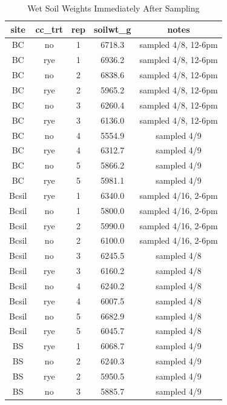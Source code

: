 \documentclass[]{article}
\begin{document}
\begin{table}[H]

\caption{\label{tab:unnamed-chunk-4}Wet Soil Weights Immediately After Sampling}
\centering
\begin{tabular}[t]{ccccc}
\toprule
site & cc\_trt & rep & soilwt\_g & notes\\
\midrule
\rowcolor{gray!6}  BC & no & 1 & 6718.3 & sampled 4/8, 12-6pm\\
BC & rye & 1 & 6936.2 & sampled 4/8, 12-6pm\\
\rowcolor{gray!6}  BC & no & 2 & 6838.6 & sampled 4/8, 12-6pm\\
BC & rye & 2 & 5965.2 & sampled 4/8, 12-6pm\\
\rowcolor{gray!6}  BC & no & 3 & 6260.4 & sampled 4/8, 12-6pm\\
\addlinespace
BC & rye & 3 & 6136.0 & sampled 4/8, 12-6pm\\
\rowcolor{gray!6}  BC & no & 4 & 5554.9 & sampled 4/9\\
BC & rye & 4 & 6312.7 & sampled 4/9\\
\rowcolor{gray!6}  BC & no & 5 & 5866.2 & sampled 4/9\\
BC & rye & 5 & 5981.1 & sampled 4/9\\
\addlinespace
\rowcolor{gray!6}  Bcsil & rye & 1 & 6340.0 & sampled 4/16, 2-6pm\\
Bcsil & no & 1 & 5800.0 & sampled 4/16, 2-6pm\\
\rowcolor{gray!6}  Bcsil & rye & 2 & 5990.0 & sampled 4/16, 2-6pm\\
Bcsil & no & 2 & 6100.0 & sampled 4/16, 2-6pm\\
\rowcolor{gray!6}  Bcsil & no & 3 & 6245.5 & sampled 4/8\\
\addlinespace
Bcsil & rye & 3 & 6160.2 & sampled 4/8\\
\rowcolor{gray!6}  Bcsil & no & 4 & 6240.2 & sampled 4/8\\
Bcsil & rye & 4 & 6007.5 & sampled 4/8\\
\rowcolor{gray!6}  Bcsil & no & 5 & 6682.9 & sampled 4/8\\
Bcsil & rye & 5 & 6045.7 & sampled 4/8\\
\addlinespace
\rowcolor{gray!6}  BS & rye & 1 & 6068.7 & sampled 4/9\\
BS & no & 2 & 6240.3 & sampled 4/9\\
\rowcolor{gray!6}  BS & rye & 2 & 5950.5 & sampled 4/9\\
BS & no & 3 & 5885.7 & sampled 4/9\\

\end{tabular}
\end{table}
\end{document}

